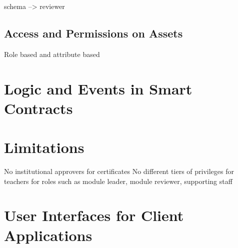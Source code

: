 schema --> reviewer

\subsection{Access and Permissions on Assets}
Role based and attribute based

\section{Logic and Events in Smart Contracts}

\section{Limitations}
No institutional approvers for certificates
No different tiers of privileges for teachers for roles such as module leader, module reviewer, supporting staff

\section{User Interfaces for Client Applications}
